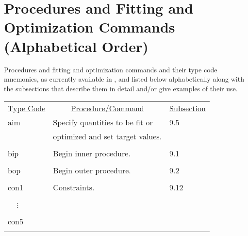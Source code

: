 \newpage
\section[Procedures and Fitting and Optimization $\cdots$
(Alphabetical Order)]{Procedures and Fitting and Optimization Commands \protect\newline
(Alphabetical Order)}
     Procedures and fitting and optimization commands and their type code
mnemonics, as currently available in , and listed below
alphabetically along with the subsections that describe them in detail
and/or give examples of their use.

\begin{center}
\begin{tabular}{lll}
\multicolumn{1}{c}{\underline {Type Code}} &
\multicolumn{1}{c}{\underline{Procedure/Command}}   &
\multicolumn{1}{c}{\underline{Subsection}} \\
\hspace{1.5em}aim    &     Specify quantities to be fit or  &  \hspace{2em}9.5\\
           &   optimized and set target values. &\\
\vspace{-3mm}& &\\
\hspace{1.5em}bip    &     Begin inner procedure.       &       \hspace{2em}9.1\\
\vspace{-3mm}& &\\
\hspace{1.5em}bop    &     Begin outer procedure.       &       \hspace{2em}9.2\\
\vspace{-3mm}& &\\
\hspace{1.5em}con1   &     Constraints.                 &        \hspace{2em}9.12\\
\vspace{-7mm}& &\\
\hspace{1.5em}\ \ \,$\vdots$ & &\\
\vspace{-7mm}& &\\
\hspace{1.5em}con5 & & \\
\vspace{-3mm}& &\\

\end{tabular}
\end{center}
